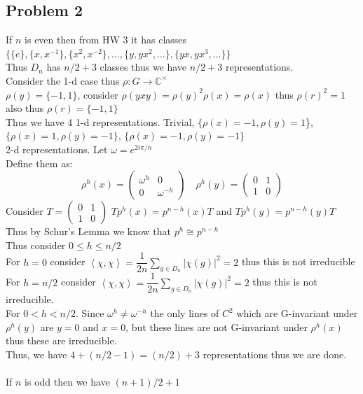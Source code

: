 \documentclass[12pt, letterpaper]{article}
\theoremstyle{definition}
\newcommand{\C}{\mathbb{C}}
\newcommand{\ang}[1]{\left\langle #1 \right\rangle}
\begin{document}
\subsection*{Problem 2}
If $n$ is even then from HW 3 it has classes $\{\{e\},\{x,x^{-1}\},\{x^2,x^{-2}\},\dots,\{y,yx^2,\dots\},\{yx,yx^3,\dots\}\}$\\
Thus $D_n$ has $n/2+3$ classes thus we have $n/2+3$ representations.\\
Consider the 1-d case thus $\rho: G \rightarrow \C^\times$\\
$\rho(y)=\{-1,1\}$, consider $\rho(yxy)=\rho(y)^2\rho(x)=\rho(x)$ thus $\rho(r)^2=1$ also thus $\rho(r)=\{-1,1\}$\\
Thus we have 4 1-d representations. Trivial, $\{\rho(x)=-1,\rho(y)=1$\}, $\{\rho(x)=1, \rho(y)=-1\}$, $\{\rho(x)=-1, \rho(y)=-1\}$\\
2-d representations. Let $\omega = e^{2i\pi/n}$\\
Define them as:
\[
\rho^h(x)=\begin{pmatrix}
    \omega^h & 0\\
    0 & \omega^{-h}
\end{pmatrix}
\quad
\rho^h(y)=\begin{pmatrix}
    0 & 1\\
    1 & 0
\end{pmatrix}
\]
Consider $T=\begin{pmatrix}
    0 & 1\\
    1 & 0
\end{pmatrix}$ $Tp^h(x)=p^{n-h}(x)T$ and $Tp^h(y)=p^{n-h}(y)T$ Thus by Schur's Lemma we know that $p^h \cong p^{n-h}$\\
Thus consider $0 \leq h \leq n/2$\\
For $h=0$ consider $\ang{\chi,\chi}=\dfrac{1}{2n}\sum_{g\in D_n}|\chi(g)|^2=2$ thus this is not irreducible\\
For $h=n/2$ consider $\ang{\chi,\chi}=\dfrac{1}{2n}\sum_{g\in D_n}|\chi(g)|^2=2$ thus this is not irreducible.\\
For $0 < h < n/2$. Since $\omega^h \neq \omega^{-h}$ the only lines of $C^2$ which are G-invariant under $\rho^h(y)$ are $y=0$ and $x=0$,
but these lines are not G-invariant under $\rho^h(x)$ thus these are irreducible.\\
Thus, we have $4+(n/2-1)=(n/2)+3$ representations thus we are done.\\
\phantom{text}\\
If $n$ is odd then we have $(n+1)/2+1$\\
\end{document}
